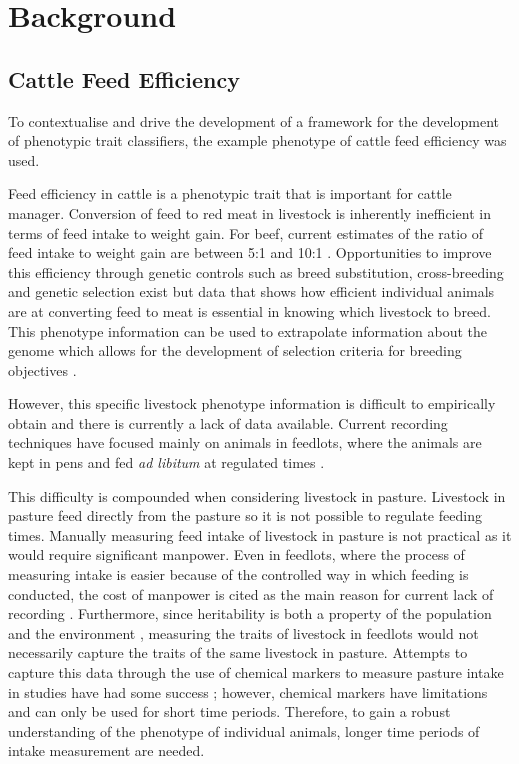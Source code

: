 \chapter{Background}

\section{Cattle Feed Efficiency}
To contextualise and drive the development of a framework for the development of phenotypic trait classifiers, the example phenotype of cattle feed efficiency was used. 

Feed efficiency in cattle is a phenotypic trait that is important for cattle manager. Conversion of feed to red meat in livestock is inherently inefficient in terms of feed intake to weight gain. For beef, current estimates of the ratio of feed intake to weight gain are between 5:1 and 10:1 \cite{Garnett2009}. Opportunities to improve this efficiency through genetic controls such as breed substitution, cross-breeding and genetic selection exist \cite{Hill2012} but data that shows how efficient individual animals are at converting feed to meat is essential in knowing which livestock to breed. This phenotype information can be used to extrapolate information about the genome which allows for the development of selection criteria for breeding objectives \cite{Pollak2012}.  

However, this specific livestock phenotype information is difficult to empirically obtain and there is currently a lack of data available. Current recording techniques have focused mainly on animals in feedlots, where the animals are kept in pens and fed \textit{ad libitum} at regulated times \cite{Arthur2005} \cite{Arthur}.

This difficulty is compounded when considering livestock in pasture. Livestock in pasture feed directly from the pasture so it is not possible to regulate feeding times. Manually measuring feed intake of livestock in pasture is not practical as it would require significant manpower. Even in feedlots, where the process of measuring intake is easier because of the controlled way in which feeding is conducted, the cost of manpower is cited as the main reason for current lack of recording \cite{Barwick2010}. Furthermore, since heritability is both a property of the population and the environment \cite{Falconer1996}, measuring the traits of livestock in feedlots would not necessarily capture the traits of the same livestock in pasture. Attempts to capture this data through the use of chemical  markers to measure pasture intake in studies have had some success \cite{Barlow2009} \cite{Dove2006}; however, chemical markers have limitations and can only be used for short time periods. Therefore, to gain a robust understanding of the phenotype of individual animals, longer time periods of intake measurement are needed.

